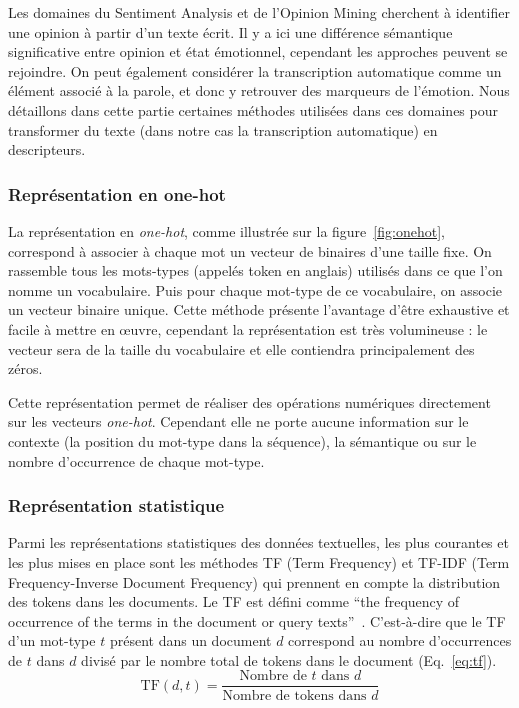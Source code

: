 Les domaines du Sentiment Analysis et de l'Opinion Mining cherchent à identifier une opinion à partir d'un texte écrit. Il y a ici une différence sémantique significative entre opinion et état émotionnel, cependant les approches peuvent se rejoindre. On peut également considérer la transcription automatique comme un élément associé à la parole, et donc y retrouver des marqueurs de l'émotion. Nous détaillons dans cette partie certaines méthodes utilisées dans ces domaines pour transformer du texte (dans notre cas la transcription automatique) en descripteurs.

\subsubsection{Représentation en one-hot}
La représentation en \textit{one-hot}, comme illustrée sur la figure~\ref{fig:onehot}, correspond à associer à chaque mot un vecteur de binaires d'une taille fixe. On rassemble tous les mots-types (appelés token en anglais) utilisés dans ce que l'on nomme un vocabulaire. Puis pour chaque mot-type de ce vocabulaire, on associe un vecteur binaire unique. Cette méthode présente l'avantage d'être exhaustive et facile à mettre en œuvre, cependant la représentation est très volumineuse : le vecteur sera de la taille du vocabulaire et elle contiendra principalement des zéros.



Cette représentation permet de réaliser des opérations numériques directement sur les vecteurs \textit{one-hot}. Cependant elle ne porte aucune information sur le contexte (la position du mot-type dans la séquence), la sémantique ou sur le nombre d’occurrence de chaque mot-type.

\subsubsection{Représentation statistique}
Parmi les représentations statistiques des données textuelles, les plus courantes et les plus mises en place sont les méthodes TF (Term Frequency) et TF-IDF (Term Frequency-Inverse Document Frequency) qui prennent en compte la distribution des tokens dans les documents.
Le TF est défini comme ``the frequency of occurrence of the terms in the document or query texts''~\cite{salton_tf_idf}.
C'est-à-dire que le TF d'un mot-type $t$ présent dans un document $d$ correspond au nombre d’occurrences de $t$ dans $d$ divisé par le nombre total de tokens dans le document (Eq.~\ref{eq:tf}).
\begin{equation}
    \text{TF}(d,t) = \dfrac{\text{Nombre de } t \text{ dans } d}{\text{Nombre de tokens dans } d}
\label{eq:tf}
\end{equation}


